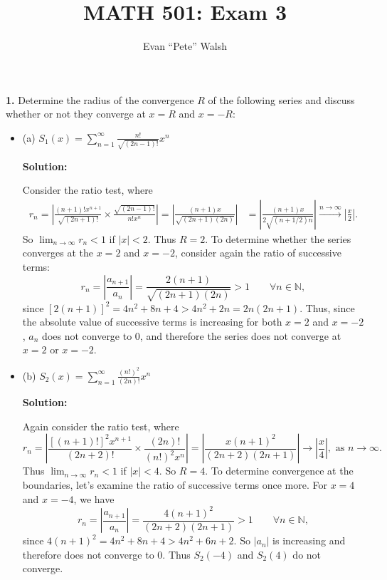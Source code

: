 \documentclass[12pt]{article}
\title{MATH 501: Exam 3}
\author{Evan ``Pete'' Walsh}
\begin{document}
\maketitle

{\bf 1.} Determine the radius of the convergence $R$ of the following series and
discuss whether or not they converge at $x = R$ and $x = -R$:

\begin{itemize}[label={},leftmargin=4mm, itemsep=1em, parsep=1em]
  \item (a) $S_{1}(x) = \sum_{n=1}^{\infty}\frac{n!}{\sqrt{(2n-1)!}}x^{n}$ 

  {\bf Solution:}

  Consider the ratio test, where 
  \begin{align*}
    r_{n} = \left|\frac{(n+1)!x^{n+1}}{\sqrt{(2n+1)!}}\times
    \frac{\sqrt{(2n-1)!}}{n!x^{n}}\right| = \left|
    \frac{(n+1)x}{\sqrt{(2n+1)(2n)}}\right| & =
    \left|\frac{(n+1)x}{2\sqrt{(n+1/2)n}}\right| \stackrel{n\rightarrow
    \infty}{\longrightarrow}
    \left|\frac{x}{2}\right|.
  \end{align*}
  So $\lim_{n\rightarrow \infty}r_{n} < 1$ if $|x| <
  2$. Thus $R = 2$. To determine whether the series converges at the $x = 2$ and
  $x = -2$,
  consider again the ratio of successive terms:
  \[ r_{n} = \left|\frac{a_{n+1}}{a_{n}}\right| =
  \frac{2(n+1)}{\sqrt{(2n+1)(2n)}} > 1 \qquad \forall n \in \mathbb{N}, \]
  since $[2(n+1)]^{2} = 4n^{2} + 8n + 4 > 4n^{2} + 2n = 2n(2n+1)$. Thus, since
  the absolute value of successive terms is increasing for both $x = 2$ and $x =
  -2$, $a_{n}$ does not
  converge to 0, and therefore the series does not converge at $x = 2$ or $x =
  -2$.

  \item (b) $S_{2}(x) = \sum_{n=1}^{\infty}\frac{(n!)^{2}}{(2n)!}x^{n}$

  {\bf Solution:}

  Again consider the ratio test, where 
  \[ r_{n} =
    \left|\frac{[(n+1)!]^{2}x^{n+1}}{(2n+2)!}\times\frac{(2n)!}{(n!)^{2}x^{n}}\right|
    = \left|\frac{x(n+1)^{2}}{(2n+2)(2n+1)}\right| \rightarrow
  \left|\frac{x}{4}\right|, \text{ as } n\rightarrow \infty. \]
  Thus $\lim_{n\rightarrow\infty}r_{n} < 1$ if $|x| <
  4$. So $R = 4$. To determine convergence at the boundaries, let's examine the
  ratio of successive terms once more. For $x = 4$ and $x = -4$, we have 
  \[ r_{n} = \left|\frac{a_{n+1}}{a_{n}}\right| =
  \frac{4(n+1)^{2}}{(2n+2)(2n+1)} > 1 \qquad \forall n \in \mathbb{N}, \]
  since $4(n+1)^{2} = 4n^{2}+8n+4>4n^{2} + 6n+2$. So $|a_{n}|$ is increasing and
  therefore does not converge to 0. Thus $S_{2}(-4)$ and $S_{2}(4)$ do not
  converge.


\end{itemize}
\end{document}
